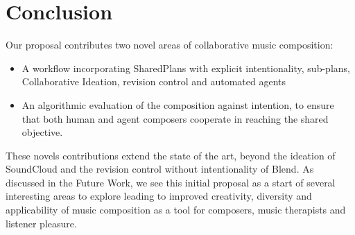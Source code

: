 \documentclass[final,authoryear,5p,times,twocolumn]{elsarticle}
\begin{document}



\section*{Conclusion}
  
Our proposal contributes two novel areas of collaborative music composition:
\begin{itemize}
	\item A workflow incorporating SharedPlans with explicit intentionality, sub-plans, Collaborative Ideation, revision control and automated agents
	\item An algorithmic evaluation of the composition against intention, to ensure that both human and agent composers cooperate in reaching the shared objective.
\end{itemize}


These novels contributions extend the state of the art, beyond the ideation of SoundCloud and the revision control without intentionality of Blend. As discussed in the Future Work, we see this initial proposal as a start of several interesting areas to explore leading to improved creativity, diversity and applicability of music composition as a tool for composers, music therapists and listener pleasure.
 
\end{document}
